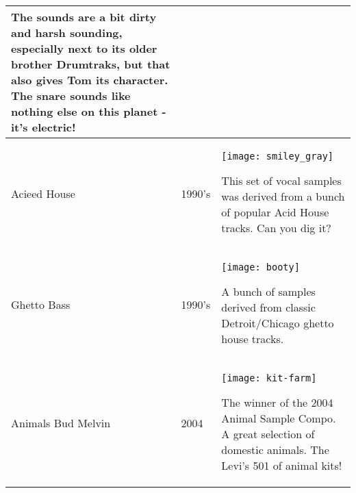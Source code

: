 \begin{xtabular}{p{2.4cm}|l|p{9.1cm}}
The sounds are a bit dirty and harsh sounding, especially next to its older brother Drumtraks, but that also gives Tom its character. The snare sounds like nothing else on this planet - it's electric! \\
\hline
Acieed House & 1990's & 
\texttt{[image: smiley\_gray]}

This set of vocal samples was derived from a bunch of popular Acid House tracks. Can you dig it? \\
\hline
Ghetto Bass & 1990's & 
\texttt{[image: booty]} 

A bunch of samples derived from classic Detroit/Chicago ghetto house tracks.\\
\hline
Animals \linebreak Bud Melvin & 2004 & 
\texttt{[image: kit-farm]} 

The winner of the 2004 Animal Sample Compo. A great selection of domestic animals. The Levi's 501 of animal kits! \\
\end{xtabular}

